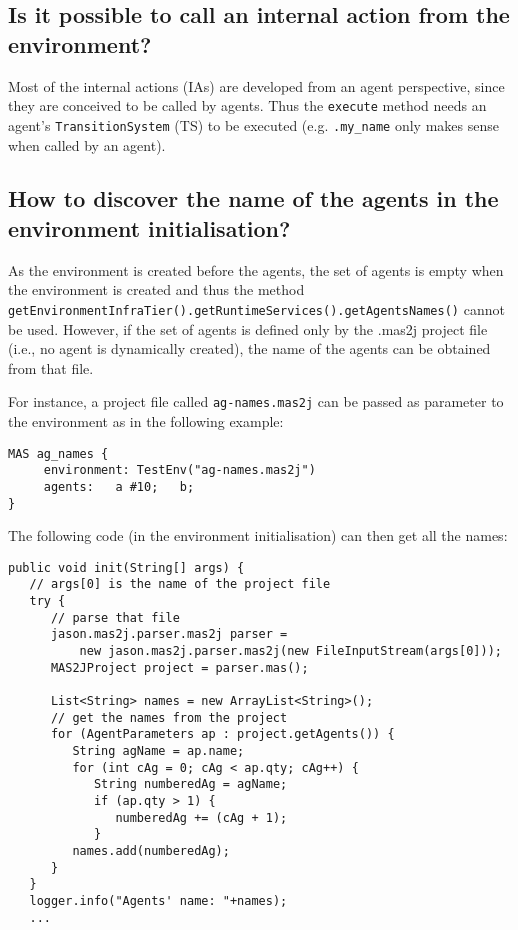 \documentclass{article}
\newcommand{\code}[1]{\texttt{#1}}
\begin{document}
\subsection{Is it possible to call an internal action from the
environment?}

Most of the internal actions (IAs) are developed from an agent
perspective, since they are conceived to be called by agents. Thus the
\code{execute} method needs an agent's
\code{TransitionSystem} (TS) to be executed (e.g. \code{.my_name} only makes
sense when called by an agent).


\subsection{How to discover the name of the agents in the environment initialisation?}

As the environment is created before the agents, the set of agents
is empty when the environment is created and thus the method
\texttt{getEnvironmentInfraTier().getRuntimeServices().getAgentsNames()}
cannot be used. However, if the set of agents is defined only by the
.mas2j project file (i.e., no agent is dynamically created), the name
of the agents can be obtained from that file.

For instance, a project file called \texttt{ag-names.mas2j} can be
passed as parameter to the environment as in the following example:

\begin{verbatim}
MAS ag_names {
     environment: TestEnv("ag-names.mas2j")
     agents:   a #10;   b;
}
\end{verbatim}

The following code (in the environment initialisation) can then get
all the names:

\begin{verbatim}
public void init(String[] args) {
   // args[0] is the name of the project file
   try {
      // parse that file
      jason.mas2j.parser.mas2j parser =
          new jason.mas2j.parser.mas2j(new FileInputStream(args[0]));
      MAS2JProject project = parser.mas();
			
      List<String> names = new ArrayList<String>();
      // get the names from the project
      for (AgentParameters ap : project.getAgents()) {
         String agName = ap.name;
         for (int cAg = 0; cAg < ap.qty; cAg++) {
            String numberedAg = agName;
            if (ap.qty > 1) {
               numberedAg += (cAg + 1);
            }
         names.add(numberedAg);
      }
   }
   logger.info("Agents' name: "+names);
   ...
\end{verbatim}
\end{document}
